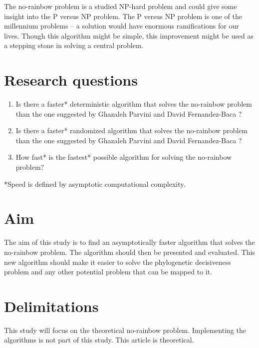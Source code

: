 \documentclass[msc,lith,english]{liuthesis}
\begin{document}
The no-rainbow problem is a studied NP-hard problem and could give some insight into the P versus NP problem.
The P versus NP problem is one of the millennium problems -- a solution would have enormous ramifications for our lives.
Though this algorithm might be simple, this improvement might be used as a
stepping stone in solving a central problem.


\section{Research questions}
\begin{enumerate}
  \item Is there a faster* deterministic algorithm that solves the no-rainbow problem than the one suggested by Ghazaleh Parvini and David Fernandez-Baca \cite{sourceNoRainbow}?
  \item Is there a faster* randomized algorithm that solves the no-rainbow problem than the one suggested by Ghazaleh Parvini and David Fernandez-Baca \cite{sourceNoRainbow}?
  \item How fast* is the fastest* possible algorithm for solving the no-rainbow problem? 
\end{enumerate}
*Speed is defined by asymptotic computational complexity.

\section{Aim}
The aim of this study is to find an asymptotically faster algorithm that solves
the no-rainbow problem. The algorithm should then be presented and evaluated.
This new algorithm should make it easier to solve the phylogenetic decisiveness
problem and any other potential problem that can be mapped to it.

\section{Delimitations}
This study will focus on the theoretical no-rainbow problem.
Implementing the algorithms is not part of this study.
This article is theoretical.
\end{document}

